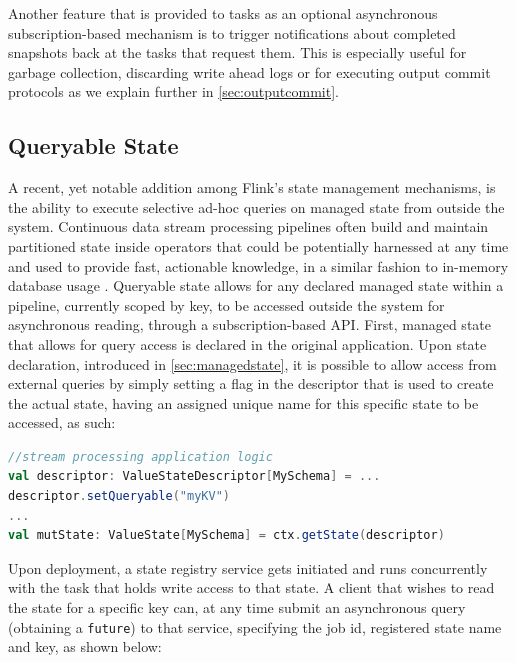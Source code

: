 Another feature that is provided to tasks as an optional asynchronous subscription-based mechanism is to trigger notifications about completed snapshots back at the tasks that request them. This is especially useful for garbage collection, discarding write ahead logs or for executing output commit protocols as we explain further in \autoref{sec:outputcommit}.

\subsection{Queryable State}

A recent, yet notable addition among Flink's state management mechanisms, is the ability to execute selective ad-hoc queries on managed state from outside the system. Continuous data stream processing pipelines often build and maintain partitioned state inside operators that could be potentially harnessed at any time and used to provide fast, actionable knowledge, in a similar fashion to in-memory database usage \cite{kipfanalytics}. Queryable state allows for any declared managed state within a pipeline, currently scoped by key, to be accessed outside the system for asynchronous reading, through a subscription-based API. First, managed state that allows for query access is declared in the original application. Upon state declaration, introduced in \autoref{sec:managedstate}, it is possible to allow access from external queries by simply setting a flag in the descriptor that is used to create the actual state, having an assigned unique name for this specific state to be accessed, as such:

\begin{lstlisting}[language=scala]
//stream processing application logic
val descriptor: ValueStateDescriptor[MySchema] = ...
descriptor.setQueryable("myKV")
...
val mutState: ValueState[MySchema] = ctx.getState(descriptor)
\end{lstlisting}

\para{} Upon deployment, a state registry service gets initiated and runs concurrently with the task that holds write access to that state. A client that wishes to read the state for a specific key can, at any time submit an asynchronous query (obtaining a \texttt{future}) to that service, specifying the job id, registered state name and key, as shown below:

